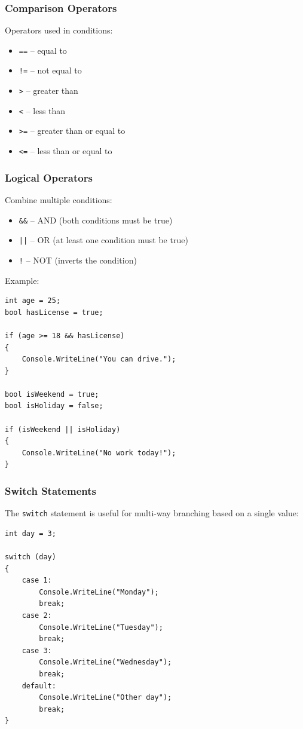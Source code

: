 \documentclass{article}
\begin{document}
\subsubsection{Comparison Operators}
Operators used in conditions:
\begin{itemize}
    \item \texttt{==} -- equal to
    \item \texttt{!=} -- not equal to
    \item \texttt{>} -- greater than
    \item \texttt{<} -- less than
    \item \texttt{>=} -- greater than or equal to
    \item \texttt{<=} -- less than or equal to
\end{itemize}

\subsubsection{Logical Operators}
Combine multiple conditions:
\begin{itemize}
    \item \texttt{\&\&} -- AND (both conditions must be true)
    \item \texttt{||} -- OR (at least one condition must be true)
    \item \texttt{!} -- NOT (inverts the condition)
\end{itemize}

Example:
\begin{verbatim}
int age = 25;
bool hasLicense = true;

if (age >= 18 && hasLicense)
{
    Console.WriteLine("You can drive.");
}

bool isWeekend = true;
bool isHoliday = false;

if (isWeekend || isHoliday)
{
    Console.WriteLine("No work today!");
}
\end{verbatim}

\subsubsection{Switch Statements}
The \texttt{switch} statement is useful for multi-way branching based on a single value:

\begin{verbatim}
int day = 3;

switch (day)
{
    case 1:
        Console.WriteLine("Monday");
        break;
    case 2:
        Console.WriteLine("Tuesday");
        break;
    case 3:
        Console.WriteLine("Wednesday");
        break;
    default:
        Console.WriteLine("Other day");
        break;
}
\end{verbatim}
\end{document}

